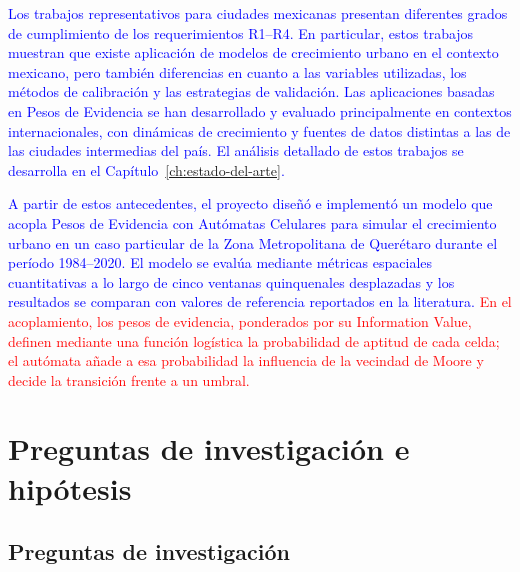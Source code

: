 
\textcolor{blue}{Los trabajos representativos para ciudades mexicanas \parencite{SuarezDelgado2007,RamirezHernandez2021,Chihuahua2023} presentan diferentes grados de cumplimiento de los requerimientos R1--R4. En particular, estos trabajos muestran que existe aplicación de modelos de crecimiento urbano en el contexto mexicano, pero también diferencias en cuanto a las variables utilizadas, los métodos de calibración y las estrategias de validación. Las aplicaciones basadas en Pesos de Evidencia se han desarrollado y evaluado principalmente en contextos internacionales, con dinámicas de crecimiento y fuentes de datos distintas a las de las ciudades intermedias del país. El análisis detallado de estos trabajos se desarrolla en el Capítulo~\ref{ch:estado-del-arte}.}


\textcolor{blue}{A partir de estos antecedentes, el proyecto diseñó e implementó un modelo que acopla Pesos de Evidencia con Autómatas Celulares para simular el crecimiento urbano en un caso particular de la Zona Metropolitana de Querétaro durante el período 1984--2020. El modelo se evalúa mediante métricas espaciales cuantitativas a lo largo de cinco ventanas quinquenales desplazadas y los resultados se comparan con valores de referencia reportados en la literatura.} \textcolor{red}{En el acoplamiento, los pesos de evidencia, ponderados por su Information Value, definen mediante una función logística la probabilidad de aptitud de cada celda; el autómata añade a esa probabilidad la influencia de la vecindad de Moore y decide la transición frente a un umbral.}

\section{Preguntas de investigación e hipótesis}

\subsection{Preguntas de investigación}

